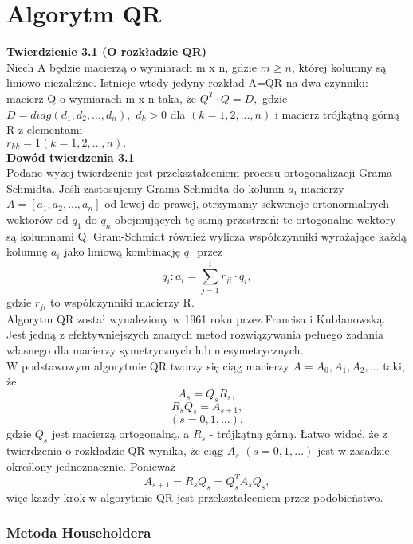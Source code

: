 \documentclass[10pt,a4paper]{report}
\begin{document}
\chapter{Algorytm QR}

\noindent \textbf{Twierdzienie 3.1 (O rozkładzie QR)}\\
\noindent Niech A będzie macierzą o wymiarach m x n, gdzie $m\ge n$, której kolumny są liniowo niezależne. Istnieje wtedy jedyny rozkład A=QR na dwa czynniki: macierz Q o wymiarach m x n taka, że $Q^{T}\cdot Q=D,$ gdzie\\ $D= diag (d_{1}, d_{2}, ..., d_{n}),$  $d_{k}>0$ dla $(k = 1, 2, ..., n)$ i macierz trójkątną górną R z elementami\\ $r_{kk}= 1 (k = 1, 2, ..., n).$\\

\noindent \textbf{Dowód twierdzenia 3.1}\\
\noindent Podane wyżej twierdzenie jest przekształceniem
procesu ortogonalizacji Grama-Schmidta. Jeśli zastosujemy Grama-Schmidta do kolumn $a_{i}$ macierzy
 $A = [a_{1}, a_{2}, ..., a_{n}]$ od lewej do prawej, otrzymamy
sekwencje ortonormalnych wektorów od $q_{1}$ do $q_{n}$ obejmujących tę samą przestrzeń:
te ortogonalne wektory są kolumnami Q. Gram-Schmidt również wylicza
współczynniki wyrażające każdą kolumnę $a_{i}$
 jako liniową kombinację $q_{1}$ przez $$q_{i}: a_{i}= \sum_{j=1}^i r_{ji}\cdot q_{i}, $$ gdzie $r_{ji}$ to współczynniki macierzy R.\\


\noindent Algorytm QR został wynaleziony w 1961 roku przez Francisa i Kubłanowską. Jest jedną z efektywniejszych znanych metod rozwiązywania pełnego zadania własnego dla macierzy symetrycznych lub niesymetrycznych.\\
\noindent W podstawowym algorytmie QR tworzy się ciąg macierzy $A= A_{0}, A_{1}, A_{2}, ...$ taki, że $$ A_{s}=Q_{s}R_{s},$$ $$R_{s}Q_{s}=A_{s+1},$$ $$(s=0, 1, ...),$$ gdzie $Q_{s}$ jest macierzą ortogonalną, a $R_{s}$ - trójkątną górną. Łatwo widać, że z twierdzenia o rozkładzie QR wynika, że ciąg $A_{s}$ $(s=0, 1, ...)$ jest w zasadzie określony jednoznacznie. Ponieważ $$ A_{s+1}=R_{s}Q_{s}=Q_{s}^{T}A_{s}Q_{s},$$ więc każdy krok w algorytmie QR jest przekształceniem przez podobieństwo. \\

\subsection*{Metoda Householdera}
\end{document}
